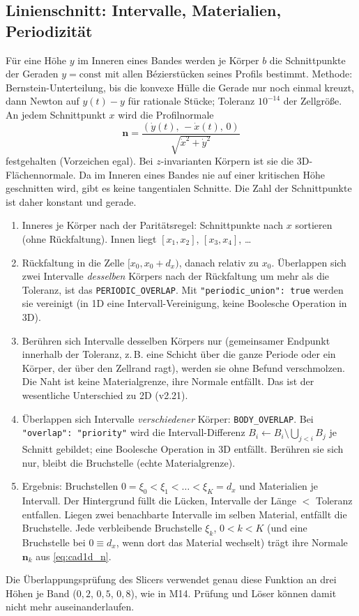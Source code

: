 \subsection{Linienschnitt: Intervalle, Materialien, Periodizität}\label{sec:cad1d_line}
Für eine Höhe $y$ im Inneren eines Bandes werden je Körper $b$ die Schnittpunkte der Geraden $y=\text{const}$ mit allen
Bézierstücken seines Profils bestimmt. Methode: Bernstein-Unterteilung, bis die konvexe Hülle die Gerade nur noch
einmal kreuzt, dann Newton auf $y(t)-y$ für rationale Stücke; Toleranz $10^{-14}$ der Zellgröße. An jedem
Schnittpunkt $x$ wird die Profilnormale
\begin{equation}
  \mathbf n=\frac{(\dot y(t),\,-\dot x(t),\,0)}{\sqrt{\dot x^2+\dot y^2}}\label{eq:cad1d_n}
\end{equation}
festgehalten (Vorzeichen egal). Bei $z$-invarianten Körpern ist sie die 3D-Flächennormale. Da im Inneren eines Bandes
nie auf einer kritischen Höhe geschnitten wird, gibt es keine tangentialen Schnitte. Die Zahl der Schnittpunkte ist
daher konstant und gerade.
\begin{enumerate}[nosep]
  \item Inneres je Körper nach der Paritätsregel: Schnittpunkte nach $x$ sortieren (ohne Rückfaltung). Innen liegt
        $[x_1,x_2]$, $[x_3,x_4]$, \dots
  \item Rückfaltung in die Zelle $[x_0,x_0+d_x)$, danach relativ zu $x_0$. Überlappen sich zwei Intervalle
        \emph{desselben} Körpers nach der Rückfaltung um mehr als die Toleranz, ist das \verb|PERIODIC_OVERLAP|. Mit
        \verb|"periodic_union": true| werden sie vereinigt (in 1D eine Intervall-Vereinigung, keine Boolesche Operation in 3D).
  \item Berühren sich Intervalle desselben Körpers nur (gemeinsamer Endpunkt innerhalb der Toleranz, z.\,B. eine Schicht
        über die ganze Periode oder ein Körper, der über den Zellrand ragt), werden sie ohne Befund verschmolzen. Die
        Naht ist keine Materialgrenze, ihre Normale entfällt. Das ist der wesentliche Unterschied zu 2D (v2.21).
  \item Überlappen sich Intervalle \emph{verschiedener} Körper: \verb|BODY_OVERLAP|. Bei \verb|"overlap": "priority"|
        wird die Intervall-Differenz $B_i\leftarrow B_i\setminus\bigcup_{j<i}B_j$ je Schnitt gebildet; eine Boolesche
        Operation in 3D entfällt. Berühren sie sich nur, bleibt die Bruchstelle (echte Materialgrenze).
  \item Ergebnis: Bruchstellen $0=\xi_0<\xi_1<\dots<\xi_K=d_x$ und Materialien je Intervall. Der Hintergrund füllt die
        Lücken, Intervalle der Länge $<$ Toleranz entfallen. Liegen zwei benachbarte Intervalle im selben Material,
        entfällt die Bruchstelle. Jede verbleibende Bruchstelle $\xi_k$, $0<k<K$ (und eine Bruchstelle bei $0\equiv d_x$,
        wenn dort das Material wechselt) trägt ihre Normale $\mathbf n_k$ aus \eqref{eq:cad1d_n}.
\end{enumerate}
Die Überlappungsprüfung des Slicers verwendet genau diese Funktion an drei Höhen je Band ($0{,}2$, $0{,}5$, $0{,}8$), wie in
M14. Prüfung und Löser können damit nicht mehr auseinanderlaufen.

